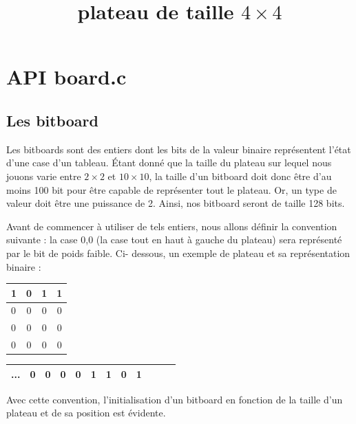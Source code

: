 \documentclass{report}
\begin{document}
\section{API board.c}
\subsection{Les bitboard}

Les bitboards sont des entiers dont les bits de la valeur binaire représentent l'état d'une case d'un tableau. \'Etant donné que la taille du plateau sur lequel nous jouons varie entre $2\times2$ et $10\times10$, la taille d'un bitboard doit donc être d'au moins 100 bit pour être capable de représenter tout le plateau. Or, un type de valeur doit être une puissance de 2. Ainsi, nos bitboard seront de taille 128 bits.

Avant de commencer à utiliser de tels entiers, nous allons définir la convention suivante : la case 0,0 (la case tout en haut à gauche du plateau) sera représenté par le bit de poids faible.\newline
\newline
Ci- dessous, un exemple de plateau et sa représentation binaire :
\begin{center}

\renewcommand{\arraystretch} {1.5}
    \begin{tabular}{|p{0.2cm}|c|c|c|}
        \hline
        1 & 0 & 1 & 1\\
        \hline
        0 & 0 & 0 & 0 \\
        \hline
        0 & 0 & 0 & 0 \\
        \hline
        0 & 0 & 0 & 0 \\
        \hline
    \end{tabular}

\end{center}
\begin{center}
        \title{plateau de taille $4\times4$}
\end{center}

\begin{center}
\renewcommand{\arraystretch} {1.5}
       \begin{tabular}{|c|c|c|c|c|c|c|c|c|c|c|c|}
        \hline
        ... & 0 & 0 & 0 & 0 & 1 & 1 & 0 & 1 \\
        \hline
    \end{tabular}
\end{center}

Avec cette convention, l'initialisation d'un bitboard en fonction de la taille d'un plateau et de sa position est évidente.
\end{document}
